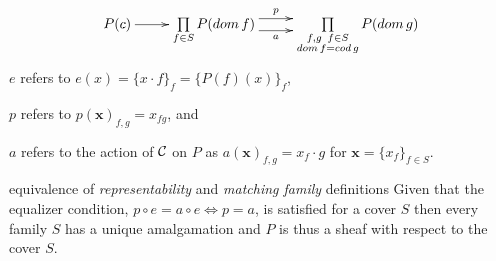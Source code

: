 \begin{frame}
\begin{block}{}
\begin{displaymath}
\xymatrix{
P(c) \ar[r]
&
\prod\limits_{f \in S}
P(dom \, f)
\ar@<1ex>[r]^-{p} \ar@<-1ex>[r]_-{a}
&
\prod\limits_{\substack{f,g \,\,\, f \in S \\ dom \, f=cod \, g}}
P(dom \, g)
}
\end{displaymath}
$e$ refers to $e(x)=\{x \cdot f\}_f = \{P(f)(x)\}_f$, 

$p$ refers to $p( \mathbf{x} )_{f,g} = x_{fg}$, and 

$a$ refers to the action of ${\mathcal C}$ on $P$ as $a( \mathbf{x} )_{f,g} = x_f \cdot g$ for $\mathbf{x} = \{ x_f \}_{f \in S}$. 
\end{block}
\begin{block}{equivalence of {\it representability} and {\it matching family} definitions}
Given that the equalizer condition, $p \circ e = a \circ e \Leftrightarrow p=a$, is satisfied for a cover $S$ then every family $S$ has a unique amalgamation and $P$ is thus a sheaf with respect to the cover $S$.
\end{block}
\end{frame}